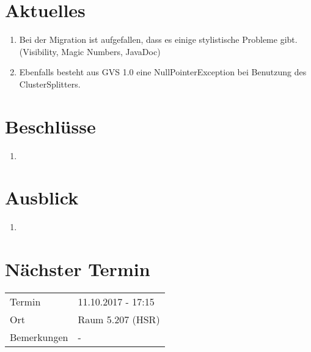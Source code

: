 \documentclass[11pt, a4paper,oneside]{scrartcl}
\begin{document}
\section{Aktuelles}
\begin{enumerate}
	\item Bei der Migration ist aufgefallen, dass es einige stylistische Probleme gibt. (Visibility, Magic Numbers, JavaDoc)
	\item Ebenfalls besteht aus GVS 1.0 eine NullPointerException bei Benutzung des ClusterSplitters.
\end{enumerate}

\section{Beschlüsse}
\begin{enumerate}
	\item
\end{enumerate}

\section{Ausblick}
\begin{enumerate}
	\item 
\end{enumerate}

\section{Nächster Termin}
\begin{tabu} to \linewidth {l X }
	\toprule
	Termin & 11.10.2017 - 17:15 \\
	Ort & Raum 5.207 (HSR) \\
	Bemerkungen & - \\
	\bottomrule
\end{tabu}
\end{document}
